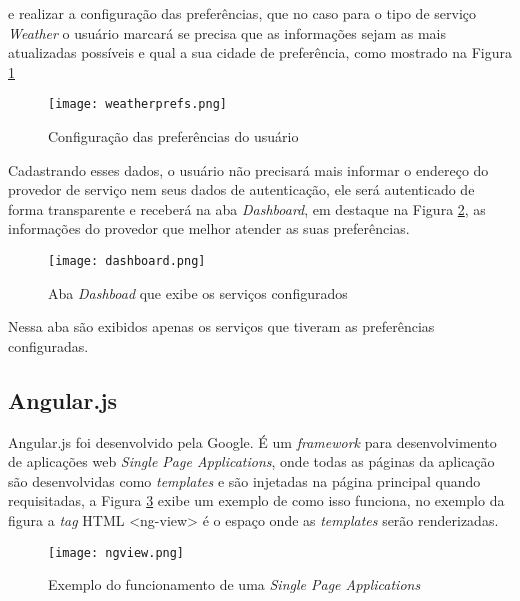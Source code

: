 e realizar a configuração das preferências, que no caso para o tipo de serviço \textit{Weather} o usuário marcará se precisa que as informações sejam as mais atualizadas possíveis e qual a sua cidade de preferência, como mostrado na Figura \ref{fig:weatherprefs}

\begin{figure}[!htb]
  \centering
  \texttt{[image: weatherprefs.png]} %
  \caption[Configuração das preferências do usuário]{Configuração das preferências do usuário}
  \label{fig:weatherprefs}
\end{figure}

Cadastrando esses dados, o usuário não precisará mais informar o endereço do provedor de serviço nem seus dados de autenticação, ele será autenticado de forma transparente e receberá na aba \textit{Dashboard}, em destaque na Figura \ref{fig:dashboard}, as informações do provedor que melhor atender as suas preferências.

\begin{figure}[!htb]
  \centering
  \texttt{[image: dashboard.png]} %
  \caption[Aba \textit{Dashboad} que exibe os serviços configurados]{Aba \textit{Dashboad} que exibe os serviços configurados}
  \label{fig:dashboard}
\end{figure}

Nessa aba são exibidos apenas os serviços que tiveram as preferências configuradas.

\subsection{Angular.js}
Angular.js foi desenvolvido pela Google. É um \textit{framework} para desenvolvimento de aplicações web \textit{Single Page Applications}, onde todas as páginas da aplicação são desenvolvidas como \textit{templates} e são injetadas na página principal quando requisitadas, a Figura \ref{fig:ngview} exibe um exemplo de como isso funciona, no exemplo da figura a \textit{tag} HTML <ng-view> é o espaço onde as \textit{templates} serão renderizadas.

\begin{figure}[!htb]
  \centering
  \texttt{[image: ngview.png]} %
  \caption[Exemplo do funcionamento de uma \textit{Single Page Applications}]{Exemplo do funcionamento de uma \textit{Single Page Applications}}
  \label{fig:ngview}
\end{figure}

